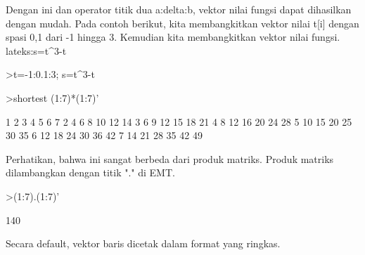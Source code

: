 \documentclass[a4paper,10pt]{article}
\begin{document}
\begin{eulernotebook}
\begin{eulercomment}
\begin{eulercomment}
\begin{eulercomment}
\begin{eulercomment}
\begin{eulercomment}
Dengan ini dan operator titik dua a:delta:b, vektor nilai fungsi dapat
dihasilkan dengan mudah. Pada contoh berikut, kita membangkitkan
vektor nilai t[i] dengan spasi 0,1 dari -1 hingga 3. Kemudian kita
membangkitkan vektor nilai fungsi.\\
lateks:s=t\textasciicircum{}3-t
\end{eulercomment}
\begin{eulerprompt}
>t=-1:0.1:3; s=t^3-t
\end{eulerprompt}
\begin{euleroutput}
  [0,  0.1709999999999999,  0.2879999999999999,  0.357,  0.384,  0.375,
  0.3360000000000001,  0.2730000000000001,  0.1920000000000001,
  0.09900000000000014,  1.387778780781446e-16,  -0.09899999999999987,
  -0.1919999999999999,  -0.2729999999999999,  -0.336,  -0.375,  -0.384,
  -0.3570000000000001,  -0.2880000000000001,  -0.1710000000000003,
  -4.440892098500626e-16,  0.2309999999999997,  0.5279999999999998,
  0.897,  1.344000000000001,  1.875000000000001,  2.496000000000002,
  3.213000000000004,  4.032000000000004,  4.959000000000006,
  6.000000000000005,  7.161000000000006,  8.448000000000008,
  9.86700000000001,  11.42400000000001,  13.12500000000001,
  14.97600000000002,  16.98300000000003,  19.15200000000003,
  21.48900000000003,  24.00000000000004]
\end{euleroutput}
\begin{eulerprompt}
>shortest (1:7)*(1:7)'
\end{eulerprompt}
\begin{euleroutput}
       1      2      3      4      5      6      7 
       2      4      6      8     10     12     14 
       3      6      9     12     15     18     21 
       4      8     12     16     20     24     28 
       5     10     15     20     25     30     35 
       6     12     18     24     30     36     42 
       7     14     21     28     35     42     49 
\end{euleroutput}
\begin{eulercomment}
Perhatikan, bahwa ini sangat berbeda dari produk matriks. Produk
matriks dilambangkan dengan titik "." di EMT.
\end{eulercomment}
\begin{eulerprompt}
>(1:7).(1:7)'
\end{eulerprompt}
\begin{euleroutput}
  140
\end{euleroutput}
\begin{eulercomment}
Secara default, vektor baris dicetak dalam format yang ringkas.

\end{eulercomment}
\end{eulercomment}
\end{eulercomment}
\end{eulercomment}
\end{eulercomment}
\end{eulernotebook}
\end{document}
